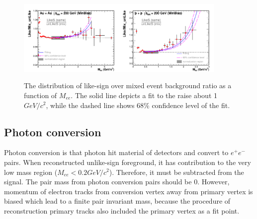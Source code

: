 \begin{figure}
\begin{centering}
\includegraphics[width=0.45\textwidth]{fig/3.Analysis/background/AuAu/paper_ratio}\includegraphics[width=0.45\textwidth]{fig/3.Analysis/background/pp/paper_ratio}
\par\end{centering}

\protect\caption{The distribution of like-sign over mixed event background ratio as
a function of $M_{ee}$. The solid line depicts a fit to the raise
about 1 $GeV/c^{2}$, while the dashed line shows 68\% confidence
level of the fit.}


\label{fig:LS/Mix}
\end{figure}



\subsection{Photon conversion}

Photon conversion is that photon hit material of detectors and convert
to $e^{+}e^{-}$ pairs. When reconstructed unlike-sign foreground,
it has contribution to the very low mass region ($M_{ee}<0.2GeV/c^{2}$).
Therefore, it must be subtracted from the signal. The pair mass from
photon conversion pairs should be 0. However, momentum of electron
tracks from conversion vertex away from primary vertex is biased which
lead to a finite pair invariant mass, because the procedure of reconstruction
primary tracks also included the primary vertex as a fit point. 

